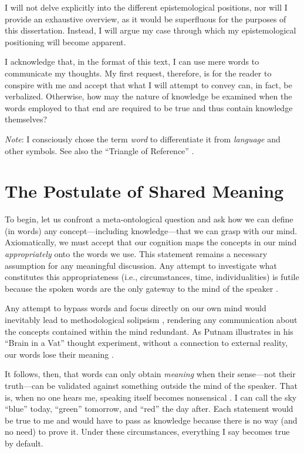 I will not delve explicitly into the different epistemological positions, nor will I provide an exhaustive overview, as it would be superfluous for the purposes of this dissertation. Instead, I will argue my case through which my epistemological positioning will become apparent.

I acknowledge that, in the format of this text, I can use mere words to communicate my thoughts. My first request, therefore, is for the reader to conspire with me and accept that what I will attempt to convey can, in fact, be verbalized. Otherwise, how may the nature of knowledge be examined when the words employed to that end are required to be true and thus contain knowledge themselves?

\textit{Note}: I consciously chose the term \textit{word} to differentiate it from \textit{language} and other symbols. See also the \enquote{Triangle of Reference} \parencite{ogden1923meaning}.

\section*{The Postulate of Shared Meaning}

To begin, let us confront a meta-ontological question and ask how we can define (in words) any concept—including knowledge—that we can grasp with our mind. Axiomatically, we must accept that our cognition maps the concepts in our mind \textit{appropriately} onto the words we use. This statement remains a necessary assumption for any meaningful discussion. Any attempt to investigate what constitutes this appropriateness (i.e., circumstances, time, individualities) is futile because the spoken words are the only gateway to the mind of the speaker \parencite{wittgenstein1953philosophical}.

Any attempt to bypass words and focus directly on our own mind would inevitably lead to methodological solipsism \parencite[136]{putnam1975meaning}, rendering any communication about the concepts contained within the mind redundant. As Putnam illustrates in his \enquote{Brain in a Vat} thought experiment, without a connection to external reality, our words lose their meaning \parencite{putnam1981reason}.

It follows, then, that words can only obtain \textit{meaning} when their sense—not their truth—can be validated against something outside the mind of the speaker. That is, when no one hears me, speaking itself becomes nonsensical \parencite{wittgenstein1922tractatus}. I can call the sky \enquote{blue} today, \enquote{green} tomorrow, and \enquote{red} the day after. Each statement would be true to me and would have to pass as knowledge because there is no way (and no need) to prove it. Under these circumstances, everything I say becomes true by default.

